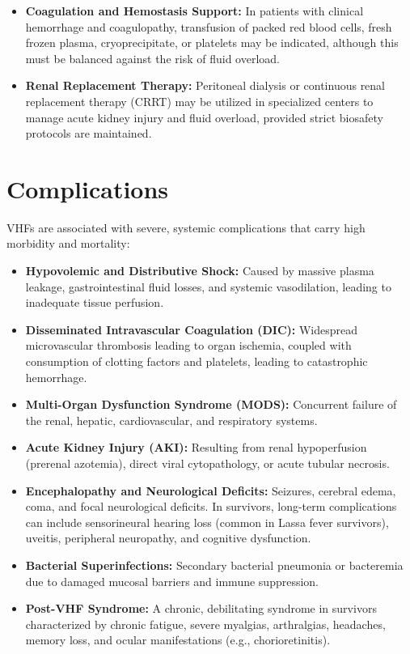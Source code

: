 \begin{itemize}
\begin{itemize}
  \item \textbf{Empiric Antimicrobial Therapy:} Broad-spectrum antibiotics (e.g., ceftriaxone) and antimalarials (e.g., artemether-lumefantrine) are often administered concurrently while waiting for definitive laboratory results, as bacterial sepsis and malaria are common co-infections.
  \end{itemize}
\item \textbf{Coagulation and Hemostasis Support:} In patients with clinical hemorrhage and coagulopathy, transfusion of packed red blood cells, fresh frozen plasma, cryoprecipitate, or platelets may be indicated, although this must be balanced against the risk of fluid overload.
\item \textbf{Renal Replacement Therapy:} Peritoneal dialysis or continuous renal replacement therapy (CRRT) may be utilized in specialized centers to manage acute kidney injury and fluid overload, provided strict biosafety protocols are maintained.
\end{itemize}

\section*{Complications}
VHFs are associated with severe, systemic complications that carry high morbidity and mortality:

\begin{itemize}
\item \textbf{Hypovolemic and Distributive Shock:} Caused by massive plasma leakage, gastrointestinal fluid losses, and systemic vasodilation, leading to inadequate tissue perfusion.
\item \textbf{Disseminated Intravascular Coagulation (DIC):} Widespread microvascular thrombosis leading to organ ischemia, coupled with consumption of clotting factors and platelets, leading to catastrophic hemorrhage.
\item \textbf{Multi-Organ Dysfunction Syndrome (MODS):} Concurrent failure of the renal, hepatic, cardiovascular, and respiratory systems.
\item \textbf{Acute Kidney Injury (AKI):} Resulting from renal hypoperfusion (prerenal azotemia), direct viral cytopathology, or acute tubular necrosis.
\item \textbf{Encephalopathy and Neurological Deficits:} Seizures, cerebral edema, coma, and focal neurological deficits. In survivors, long-term complications can include sensorineural hearing loss (common in Lassa fever survivors), uveitis, peripheral neuropathy, and cognitive dysfunction.
\item \textbf{Bacterial Superinfections:} Secondary bacterial pneumonia or bacteremia due to damaged mucosal barriers and immune suppression.
\item \textbf{Post-VHF Syndrome:} A chronic, debilitating syndrome in survivors characterized by chronic fatigue, severe myalgias, arthralgias, headaches, memory loss, and ocular manifestations (e.g., chorioretinitis).
\end{itemize}

